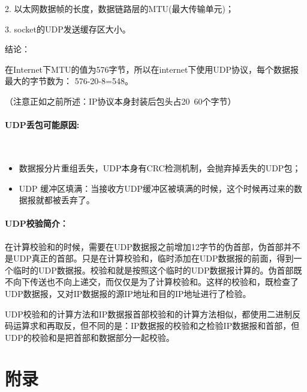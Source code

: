 \documentclass[UTF8]{article}%
\begin{document}
2. 以太网数据帧的长度，数据链路层的MTU(最大传输单元)；

3. socket的UDP发送缓存区大小。

结论：

在Internet下MTU的值为576字节，所以在internet下使用UDP协议，每个数据报最大的字节数为： 576-20-8=548。

（注意正如之前所述：IP协议本身封装后包头占20~60个字节）

\paragraph{UDP丢包可能原因:}~{}

\begin{itemize}
    \item 数据报分片重组丢失，UDP本身有CRC检测机制，会抛弃掉丢失的UDP包；
    \item UDP 缓冲区填满：当接收方UDP缓冲区被填满的时候，这个时候再过来的数据报就都被丢弃了。
\end{itemize}

\paragraph{UDP校验简介：}

在计算校验和的时候，需要在UDP数据报之前增加12字节的伪首部，伪首部并不是UDP真正的首部。只是在计算校验和，临时添加在UDP数据报的前面，得到一个临时的UDP数据报。校验和就是按照这个临时的UDP数据报计算的。伪首部既不向下传送也不向上递交，而仅仅是为了计算校验和。这样的校验和，既检查了UDP数据报，又对IP数据报的源IP地址和目的IP地址进行了检验。

UDP校验和的计算方法和IP数据报首部校验和的计算方法相似，都使用二进制反码运算求和再取反，但不同的是：IP数据报的校验和之检验IP数据报和首部，但UDP的校验和是把首部和数据部分一起校验。

\section{附录}
\end{document}
